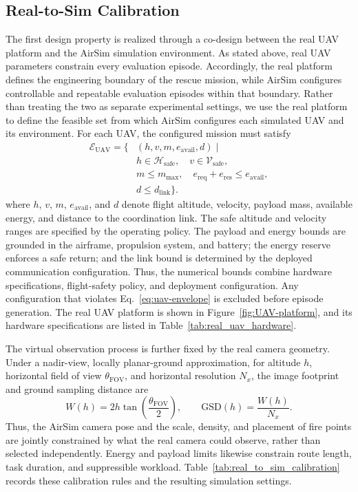 \subsection{Real-to-Sim Calibration}
The first design property is realized through a co-design between the real UAV
platform and the AirSim simulation environment. As stated above, real UAV
parameters constrain every evaluation episode. Accordingly, the real platform defines the
engineering boundary of the rescue mission, while AirSim configures controllable
and repeatable evaluation episodes within that boundary. Rather than treating the two as
separate experimental settings, we use the real platform to define the feasible
set from which AirSim configures each simulated UAV and its environment.
For each UAV, the configured mission must satisfy
\begin{equation}
\begin{aligned}
\mathcal{E}_{\mathrm{UAV}}=\{&(h,v,m,e_{\mathrm{avail}},d)\mid\\
    &h\in \mathcal{H}_{\mathrm{safe}},\quad
      v\in \mathcal{V}_{\mathrm{safe}},\\
    &m\leq m_{\max},\quad
      e_{\mathrm{req}}+e_{\mathrm{res}}\leq e_{\mathrm{avail}},\\
    &d\leq d_{\mathrm{link}}\}.
\end{aligned}
\label{eq:uav-envelope}
\end{equation}
where $h$, $v$, $m$, $e_{\mathrm{avail}}$, and $d$ denote flight altitude,
velocity, payload mass, available energy, and distance to the coordination link. The safe altitude
and velocity ranges are specified by the operating policy. The payload and energy
bounds are grounded in the airframe, propulsion system, and battery; the energy
reserve enforces a safe return; and the link bound is determined by the deployed
communication configuration. Thus, the numerical bounds combine hardware
specifications, flight-safety policy, and deployment configuration. Any
configuration that violates
Eq.~\ref{eq:uav-envelope} is excluded before episode generation. The real UAV
platform is shown in Figure~\ref{fig:UAV-platform}, and its hardware
specifications are listed in Table~\ref{tab:real_uav_hardware}.



The virtual observation process is further fixed by the real camera geometry.
Under a nadir-view, locally planar-ground approximation, for altitude $h$,
horizontal field of view $\theta_{\mathrm{FOV}}$, and horizontal
resolution $N_x$, the image footprint and ground sampling distance are
\begin{equation}
W(h)=2h\tan\left(\frac{\theta_{\mathrm{FOV}}}{2}\right),\qquad
\mathrm{GSD}(h)=\frac{W(h)}{N_x}.
\label{eq:observation-geometry}
\end{equation}
Thus, the AirSim camera pose and the scale, density, and placement of fire
points are jointly constrained by what the real camera could observe, rather
than selected independently. Energy and payload limits likewise constrain route
length, task duration, and suppressible workload. Table~\ref{tab:real_to_sim_calibration}
records these calibration rules and the resulting simulation settings.

